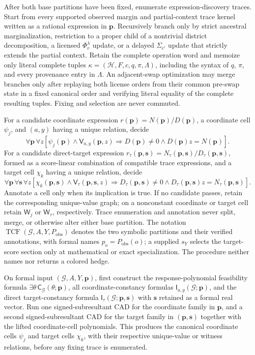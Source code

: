 After both base partitions have been fixed, enumerate expression-discovery traces. Start from every supported observed margin and partial-context trace kernel written as a rational expression in \(\mathbf p\). Recursively branch only by strict ancestral marginalization, restriction to a proper child of a nontrivial district decomposition, a licensed \(\Phi_v^{\lambda}\) update, or a delayed \(\Sigma_{c'}\) update that strictly extends the partial context. Retain the complete operation word and memoize only literal complete tuples \(\kappa=(\mathcal H,F,c,q,\pi,\Lambda)\), including the syntax of \(q\), \(\pi\), and every provenance entry in \(\Lambda\). An adjacent-swap optimization may merge branches only after replaying both license orders from their common pre-swap state in a fixed canonical order and verifying literal equality of the complete resulting tuples. Fixing and selection are never commuted.

For a candidate coordinate expression \(r(\mathbf p)=N(\mathbf p)/D(\mathbf p)\), a coordinate cell \(\psi_j\), and \((a,y)\) having a unique relation, decide
\[
\forall\mathbf p\,\forall z
\left[
\psi_j(\mathbf p)\wedge\mathsf V_{a,y}(\mathbf p,z)
\Longrightarrow
D(\mathbf p)\neq0\wedge D(\mathbf p)z=N(\mathbf p)
\right].
\]
For a candidate direct-target expression \(r_{\tau}(\mathbf p,\mathbf s)=N_{\tau}(\mathbf p,\mathbf s)/D_{\tau}(\mathbf p,\mathbf s)\), formed as a score-linear combination of compatible trace expressions, and a target cell \(\chi_k\) having a unique relation, decide
\[
\forall\mathbf p\,\forall\mathbf s\,\forall z
\left[
\chi_k(\mathbf p,\mathbf s)\wedge\mathsf V_{\tau}(\mathbf p,\mathbf s,z)
\Longrightarrow
D_{\tau}(\mathbf p,\mathbf s)\neq0
\wedge D_{\tau}(\mathbf p,\mathbf s)z=N_{\tau}(\mathbf p,\mathbf s)
\right].
\]
Annotate a cell only when its implication is true. If no candidate passes, retain the corresponding unique-value graph; on a nonconstant coordinate or target cell retain \(\mathsf W_j\) or \(\mathsf W_{\tau}\), respectively. Trace enumeration and annotation never split, merge, or otherwise alter either base partition. The notation \(\operatorname{TCF}(\mathcal G,A,Y,P_{\mathrm{obs}})\) denotes the two symbolic partitions and their verified annotations, with formal names \(p_o=P_{\mathrm{obs}}(o)\); a supplied \(s_Y\) selects the target-score section only at mathematical or exact specialization. The procedure neither names nor returns a colored hedge.

On formal input \((\mathcal G,A,Y,\mathbf p)\), first construct the response-polynomial feasibility formula \(\exists\theta\,\mathsf C_{\mathcal G}(\theta;\mathbf p)\), all coordinate-constancy formulas \(\mathsf I_{a,y}(\mathcal G;\mathbf p)\), and the direct target-constancy formula \(\mathsf I_{\tau}(\mathcal G;\mathbf p,\mathbf s)\) with \(\mathbf s\) retained as a formal real vector. Run one signed-subresultant CAD for the coordinate family in \(\mathbf p\), and a second signed-subresultant CAD for the target family in \((\mathbf p,\mathbf s)\) together with the lifted coordinate-cell polynomials. This produces the canonical coordinate cells \(\psi_j\) and target cells \(\chi_k\), with their respective unique-value or witness relations, before any fixing trace is enumerated.

